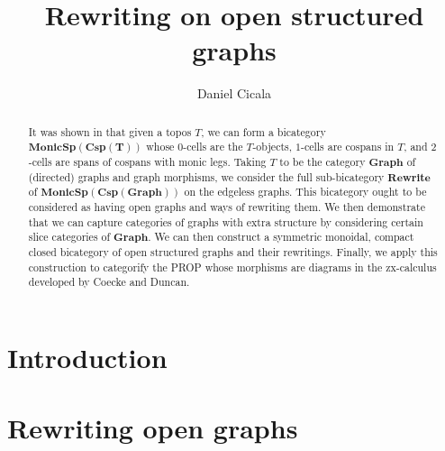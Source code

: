 \documentclass[11pt]{amsart}
\newcommand{\cat}[1]{\mathbf{#1}}
\newcommand{\bimonspcsp}[1]{\mathbf{MonicSp(Csp(#1))}}
\theoremstyle{remark}
\theoremstyle{definition}
\begin{document}
	

\begin{abstract}
	It was shown in \cite{Cic} that given a topos $T$, we can form a bicategory $\bimonspcsp{T}$ whose $0$-cells are the $T$-objects, $1$-cells are cospans in $T$, and $2$-cells are spans of cospans with monic legs. Taking $T$ to be the category $\cat{Graph}$ of (directed) graphs and graph morphisms, we consider the full sub-bicategory $\cat{Rewrite}$ of $\bimonspcsp{Graph}$ on the edgeless graphs. This bicategory ought to be considered as having open graphs and ways of rewriting them.  We then demonstrate that we can capture categories of graphs with extra structure by considering certain slice categories of $\cat{Graph}$.  We can then construct a symmetric monoidal, compact closed bicategory of open structured graphs and their rewritings.  Finally, we apply this construction to categorify the PROP whose morphisms are diagrams in the zx-calculus developed by Coecke and Duncan.
\end{abstract}

\title{Rewriting on open structured graphs}
\author{Daniel Cicala}
\maketitle

\section{Introduction}
\label{sec:Intro}

\section{Rewriting open graphs}
\label{subsec:RewritingOpenGraphs}
\end{document}
